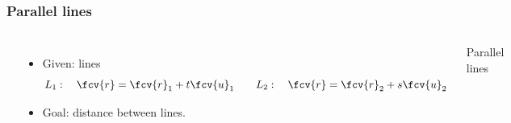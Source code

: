 \begin{frame}
  \frametitle{Parallel lines}
\begin{columns}
         \includegraphics[height=1.3in]{../../modules/vectors/pictures/ok-distance_parallel_lines.eps}
  

\begin{itemize}
\item Given: lines
    $$L_1: \quad \fcv{r}= \fcv{r}_1+t\fcv{u}_1 \qquad L_2: \quad \fcv{r}= \fcv{r}_2+s\fcv{u}_2$$
\item Goal: distance between lines.
\end{itemize}
\alert<1->{Parallel} lines
\end{columns}

\end{frame}